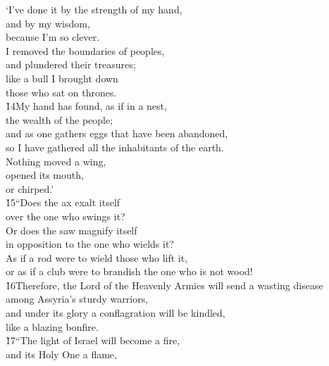 \begin{poetry}
\poeml `I've done it by the strength of my hand, \\
\poemll    and by my wisdom, \\
\poemlll       because I'm so clever. \\
\poeml I removed the boundaries of peoples, \\
\poemll    and plundered their treasures; \\
\poeml like a bull I brought down \\
\poemll    those who sat on thrones. \\
\poeml \v{14}My hand has found, as if in a nest, \\
\poemll    the wealth of the people; \\
\poeml and as one gathers eggs that have been abandoned, \\
\poemll    so I have gathered all the inhabitants of the earth. \\
\poeml Nothing moved a wing, \\
\poemll    opened its mouth, \\
\poemlll       or chirped.' \\
\poeml \v{15}``Does the ax exalt itself \\
\poemll    over the one who swings it? \\
\poeml Or does the saw magnify itself \\
\poemll    in opposition to the one who wields it? \\
\poeml As if a rod were to wield those who lift it, \\
\poemll    or as if a club were to brandish the one who is not wood! \\
\poeml \v{16}Therefore, the Lord  of the Heavenly Armies will send a wasting disease \\
\poemll    among Assyria's sturdy warriors, \\
\poeml and under its glory a conflagration will be kindled, \\
\poemll    like a blazing bonfire. \\
\poeml \v{17}``The light of Israel will become a fire, \\
\poemll    and its Holy One a flame, \\

\end{poetry}
